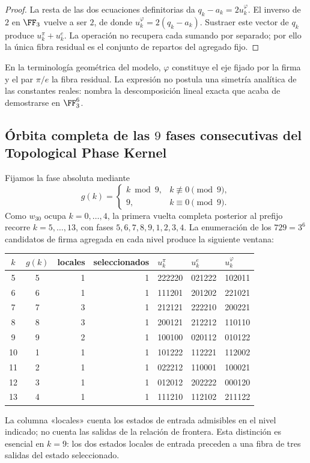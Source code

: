 \begin{proof}
La resta de las dos ecuaciones definitorias da
\(q_k-a_k=2u_k^\varphi\). El inverso de \(2\) en \(\FF_3\) vuelve a ser
\(2\), de donde
\(u_k^\varphi=2(q_k-a_k)\). Sustraer este vector de \(q_k\) produce
\(u_k^\pi+u_k^e\). La operación no recupera cada sumando por separado; por
ello la única fibra residual es el conjunto de repartos del agregado fijo.
\end{proof}

En la terminología geométrica del modelo, \(\varphi\) constituye el eje
fijado por la firma y el par \(\pi/e\) la fibra residual. La expresión no
postula una simetría analítica de las constantes reales: nombra la
descomposición lineal exacta que acaba de demostrarse en \(\FF_3^6\).
\fi

\subsection{Órbita completa de las \(9\) fases consecutivas del Topological Phase Kernel}

Fijamos la fase absoluta mediante
\[
g(k)=
\begin{cases}
k\bmod9,&k\not\equiv0\pmod9,\\
9,&k\equiv0\pmod9.
\end{cases}
\]
Como \(w_{30}\) ocupa \(k=0,\ldots,4\), la primera vuelta completa posterior
al prefijo recorre \(k=5,\ldots,13\), con fases
\(5,6,7,8,9,1,2,3,4\). La enumeración de los \(729=3^6\) candidatos de
firma agregada en cada nivel produce la siguiente ventana:
\begin{center}
\small
\begin{tabular}{@{}ccrrlll@{}}
\toprule
\(k\)&\(g(k)\)&locales&seleccionados&\(u_k^\pi\)&\(u_k^e\)&\(u_k^\varphi\)\\
\midrule
5&5&1&1&222220&021222&102011\\
6&6&1&1&111201&201202&221021\\
7&7&3&1&212121&222210&200221\\
8&8&3&1&200121&212212&110110\\
9&9&2&1&100100&020112&010122\\
10&1&1&1&101222&112221&112002\\
11&2&1&1&022212&110001&100021\\
12&3&1&1&012012&202222&000120\\
13&4&1&1&111210&112102&211122\\
\bottomrule
\end{tabular}
\end{center}
La columna «locales» cuenta los estados de entrada admisibles en el nivel
indicado; no cuenta las salidas de la relación de frontera. Esta distinción
es esencial en \(k=9\): los dos estados locales de entrada preceden a una
fibra de tres salidas del estado seleccionado.

